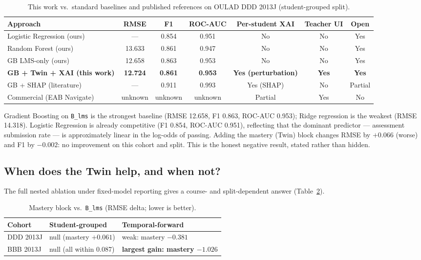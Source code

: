 \documentclass[conference]{IEEEtran}
\begin{document}
\begin{table}[!t]
\caption{This work vs.\ standard baselines and published references on OULAD DDD
2013J (student-grouped split).}
\label{tab:compare}
\centering
\footnotesize
\begin{tabular}{lcccccc}
\toprule
Approach & RMSE & F1 & ROC-AUC & Per-student XAI & Teacher UI & Open \\
\midrule
Logistic Regression (ours) & --- & 0.854 & 0.951 & No & No & Yes \\
Random Forest (ours) & 13.633 & 0.861 & 0.947 & No & No & Yes \\
GB LMS-only (ours) & 12.658 & 0.863 & 0.953 & No & No & Yes \\
\textbf{GB + Twin + XAI (this work)} & \textbf{12.724} & \textbf{0.861} & \textbf{0.953} & \textbf{Yes (perturbation)} & \textbf{Yes} & \textbf{Yes} \\
GB + SHAP (literature) \cite{lopez2025} & --- & 0.911 & 0.993 & Yes (SHAP) & No & Partial \\
Commercial (EAB Navigate) & unknown & unknown & unknown & Partial & Yes & No \\
\bottomrule
\end{tabular}
\end{table}

Gradient Boosting on \texttt{B\_lms} is the strongest baseline (RMSE 12.658,
F1 0.863, ROC-AUC 0.953); Ridge regression is the weakest (RMSE 14.318). Logistic
Regression is already competitive (F1 0.854, ROC-AUC 0.951), reflecting that the
dominant predictor --- assessment submission rate --- is approximately linear in
the log-odds of passing. Adding the mastery (Twin) block changes RMSE by
$+0.066$ (worse) and F1 by $-0.002$: no improvement on this cohort and split.
This is the honest negative result, stated rather than hidden.

\subsection{When does the Twin help, and when not?}
The full nested ablation under fixed-model reporting gives a course- and
split-dependent answer (Table~\ref{tab:twinhelp}).

\begin{table}[!t]
\caption{Mastery block vs.\ \texttt{B\_lms} (RMSE delta; lower is better).}
\label{tab:twinhelp}
\centering
\footnotesize
\begin{tabular}{lll}
\toprule
Cohort & Student-grouped & Temporal-forward \\
\midrule
DDD 2013J & null (mastery $+0.061$) & weak: mastery $-0.381$ \\
BBB 2013J & null (all within 0.087) & \textbf{largest gain: mastery $-1.026$} \\
\bottomrule
\end{tabular}
\end{table}
\end{document}
